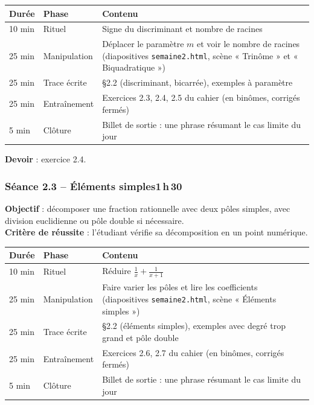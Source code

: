 \documentclass[10.5pt,a4paper]{article}
\newif\ifprof
\newcommand{\profonly}[1]{\ifprof #1\fi}
\begin{document}
\begin{longtable}{@{}p{1.1cm}p{2.4cm}p{12.4cm}@{}}
\toprule \textbf{Durée} & \textbf{Phase} & \textbf{Contenu}\\ \midrule\endhead
10 min & Rituel & Signe du discriminant et nombre de racines\\
25 min & Manipulation & Déplacer le paramètre $m$ et voir le nombre de racines (diapositives \texttt{semaine2.html}, scène « Trinôme » et « Biquadratique »)\\
25 min & Trace écrite & \S2.2 (discriminant, bicarrée), exemples à paramètre\\
25 min & Entraînement & Exercices 2.3, 2.4, 2.5 du cahier (en binômes, corrigés fermés)\\
5 min & Clôture & Billet de sortie : une phrase résumant le cas limite du jour\\ \bottomrule\end{longtable}\nopagebreak
\textbf{Devoir} : exercice 2.4.\profonly{ \textbf{Point de vigilance} : Le cas dégénéré $m=1$ est souvent oublié.}\par
{}\subsubsection*{\textcolor{marine}{Séance 2.3 -- Éléments simples}\hfill\normalfont\small\textcolor{ardoise}{1\,h\,30}}
\begin{objectif}\textbf{Objectif} : décomposer une fraction rationnelle avec deux pôles simples, avec division euclidienne ou pôle double si nécessaire.\\\textbf{Critère de réussite} : l'étudiant vérifie sa décomposition en un point numérique.\end{objectif}\nopagebreak
\begin{longtable}{@{}p{1.1cm}p{2.4cm}p{12.4cm}@{}}
\toprule \textbf{Durée} & \textbf{Phase} & \textbf{Contenu}\\ \midrule\endhead
10 min & Rituel & Réduire $\frac1x+\frac1{x+1}$\\
25 min & Manipulation & Faire varier les pôles et lire les coefficients (diapositives \texttt{semaine2.html}, scène « Éléments simples »)\\
25 min & Trace écrite & \S2.2 (éléments simples), exemples avec degré trop grand et pôle double\\
25 min & Entraînement & Exercices 2.6, 2.7 du cahier (en binômes, corrigés fermés)\\
5 min & Clôture & Billet de sortie : une phrase résumant le cas limite du jour\\ \bottomrule\end{longtable}\nopagebreak
\end{document}
